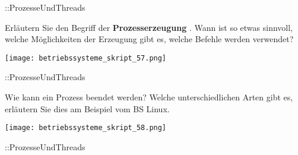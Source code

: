 \documentclass{article}
\begin{document}
\begin{tcolorbox}[colback=white!10!white,colframe=lightgray!75!black,
  savelowerto=\jobname_ex.tex]

\begin{center}
::ProzesseUndThreads

\end{center}

\tcblower

\justifying

\end{tcolorbox}
\begin{tcolorbox}[colback=white!10!white,colframe=lightgray!75!black,
  savelowerto=\jobname_ex.tex]

\begin{center}
Erläutern Sie den Begriff der 
\textbf{Prozesserzeugung
}. 
Wann ist so etwas sinnvoll, welche Möglichkeiten der Erzeugung gibt es, welche Befehle werden verwendet?

\end{center}

\tcblower

\justifying
\texttt{[image: betriebssysteme\_skript\_57.png]}

\end{tcolorbox}
\begin{tcolorbox}[colback=white!10!white,colframe=lightgray!75!black,
  savelowerto=\jobname_ex.tex]

\begin{center}
::ProzesseUndThreads

\end{center}

\tcblower

\justifying

\end{tcolorbox}
\begin{tcolorbox}[colback=white!10!white,colframe=lightgray!75!black,
  savelowerto=\jobname_ex.tex]

\begin{center}
Wie kann ein Prozess beendet werden?
Welche unterschiedlichen Arten gibt es, erläutern Sie dies am Beispiel vom BS Linux.

\end{center}

\tcblower

\justifying
\texttt{[image: betriebssysteme\_skript\_58.png]}

\end{tcolorbox}
\begin{tcolorbox}[colback=white!10!white,colframe=lightgray!75!black,
  savelowerto=\jobname_ex.tex]

\begin{center}
::ProzesseUndThreads

\end{center}

\tcblower

\justifying

\end{tcolorbox}
\end{document}
